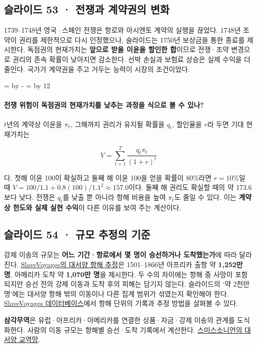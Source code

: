 \documentclass[10pt,a4paper]{article}
\newcommand{\ReserveQuestionSpace}{%
  \par\begingroup
  \dimen0=\pagegoal \advance\dimen0 by -\pagetotal
  \dimen2=\baselineskip \multiply\dimen2 by 12
  \ifdim\dimen0<\dimen2 \newpage\fi
  \endgroup}
\begin{document}
\subsection{슬라이드 53 · 전쟁과 계약권의 변화}
1739–1748년 영국·스페인 전쟁은 항로와 아시엔토 계약의 실행을 끊었다. 1748년 조약이 권리를 제한적으로 다시 인정했으나, 슬라이드는 1750년 보상금을 통한 종료를 제시한다. 독점권의 현재가치는 \textbf{앞으로 받을 이윤을 할인한 합}이므로 전쟁·조약 변경으로 권리의 존속 확률이 낮아지면 감소한다. 선박 손실과 보험료 상승은 실제 수익을 더 줄인다. 국가가 계약권을 주고 거두는 능력이 시장의 조건이었다.\par

\ReserveQuestionSpace
\paragraph{전쟁 위험이 독점권의 현재가치를 낮추는 과정을 식으로 볼 수 있나?}
$t$년의 계약상 이윤을 $\pi_t$, 그해까지 권리가 유지될 확률을 $q_t$, 할인율을 $r$라 두면 기대 현재가치는\par

\[
V=\sum_{t=1}^{T}\frac{q_t\pi_t}{(1+r)^t}
\]

다. 첫해 이윤 100이 확실하고 둘째 해 이윤 100을 얻을 확률이 80\%라면 $r=10\%$일 때 $V=100/1.1+0.8(100)/1.1^2\approx157.0$이다. 둘째 해 권리도 확실할 때의 약 173.6보다 낮다. 전쟁은 $q_t$를 낮출 뿐 아니라 항해 비용을 높여 $\pi_t$도 줄일 수 있다. 이는 \textbf{계약상 한도와 실제 실현 수익}이 다른 이유를 보여 주는 계산이다.\par

\subsection{슬라이드 54 · 규모 추정의 기준}
강제 이송의 규모는 \textbf{어느 기간·항로에서 몇 명이 승선하거나 도착했는가}에 따라 달라진다. \href{https://www.slavevoyages.org/assessment/estimates}{SlaveVoyages의 대서양 항해 추정}은 1501–1866년 아프리카 출항 약 \textbf{1,252만 명}, 아메리카 도착 약 \textbf{1,070만 명}을 제시한다. 두 수의 차이에는 항해 중 사망이 포함되지만 승선 전의 강제 이동과 도착 후의 피해는 담기지 않는다. 슬라이드의 ‘약 2천만 명’에는 대서양 항해 밖의 이동이나 다른 집계 범위가 섞였는지 확인해야 한다. \href{https://www.slavevoyages.org/}{SlaveVoyages 데이터베이스}에서 항해 단위의 기록과 추정 방법을 살펴볼 수 있다.\par

\textbf{삼각무역}은 유럽·아프리카·아메리카를 연결한 상품·자금·강제 이송의 관계를 도식화한다. 사람의 이동 규모는 항해별 승선·도착 기록에서 계산한다. \href{https://americanhistory.si.edu/explore/exhibitions/on-the-water/online/living-atlantic-world/web-connections}{스미스소니언의 대서양 교역망}.\par
\end{document}
